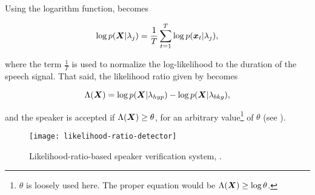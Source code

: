 \noindent Using the logarithm function,  becomes

\begin{equation}
    \log p(\dvec{X}|\lambda_j) = \frac{1}{T} \sum_{t=1}^T \log p(\dvec{x}_t|\lambda_j),
    \label{eq:log-likelihood-sum}
\end{equation}

\noindent where the term $\frac{1}{T}$ is used to normalize the log-likelihood to the duration of the speech signal. That said, the likelihood ratio given by  becomes

\begin{equation}
    \Lambda(\dvec{X}) = \log p(\dvec{X}|\lambda_{hyp}) - \log p(\dvec{X}|\lambda_{bkg}),
    \label{eq:score_of_X}
\end{equation}

\noindent and the speaker is accepted if $\Lambda(\boldsymbol{X}) \geq \theta$, for an arbitrary value\footnote{$\theta$ is loosely used here. The proper equation would be $\Lambda(\boldsymbol{X}) \geq \log\theta$.} of $\theta$ (see ).

\begin{figure}[ht]
    \centering
    \texttt{[image: likelihood-ratio-detector]}
    \caption{Likelihood-ratio-based speaker verification system, .}
    \label{fig:likelihood_ratio_detector}
\end{figure}